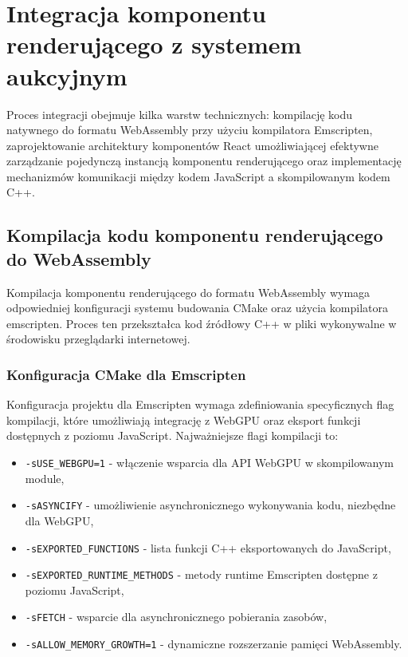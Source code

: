 \section{Integracja komponentu renderującego z systemem aukcyjnym}

Proces integracji obejmuje kilka warstw technicznych: kompilację kodu natywnego do formatu WebAssembly przy użyciu kompilatora Emscripten, zaprojektowanie architektury komponentów React umożliwiającej efektywne zarządzanie pojedynczą instancją komponentu renderującego oraz implementację mechanizmów komunikacji między kodem JavaScript a skompilowanym kodem C++.

\subsection{Kompilacja kodu komponentu renderującego do WebAssembly}

Kompilacja komponentu renderującego do formatu WebAssembly wymaga odpowiedniej konfiguracji systemu budowania CMake oraz użycia kompilatora emscripten. Proces ten przekształca kod źródłowy C++ w pliki wykonywalne w środowisku przeglądarki internetowej.

\subsubsection{Konfiguracja CMake dla Emscripten}

Konfiguracja projektu dla Emscripten wymaga zdefiniowania specyficznych flag kompilacji, które umożliwiają integrację z WebGPU oraz eksport funkcji dostępnych z poziomu JavaScript. Najważniejsze flagi kompilacji to:

\begin{itemize}
  \item \texttt{-sUSE\_WEBGPU=1} - włączenie wsparcia dla API WebGPU w skompilowanym module,
  \item \texttt{-sASYNCIFY} - umożliwienie asynchronicznego wykonywania kodu, niezbędne dla WebGPU,
  \item \texttt{-sEXPORTED\_FUNCTIONS} - lista funkcji C++ eksportowanych do JavaScript,
  \item \texttt{-sEXPORTED\_RUNTIME\_METHODS} - metody runtime Emscripten dostępne z poziomu JavaScript,
  \item \texttt{-sFETCH} - wsparcie dla asynchronicznego pobierania zasobów,
  \item \texttt{-sALLOW\_MEMORY\_GROWTH=1} - dynamiczne rozszerzanie pamięci WebAssembly.
\end{itemize}

